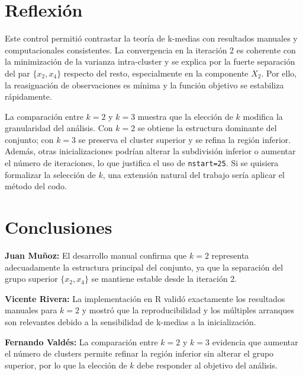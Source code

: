 \documentclass[10pt,a4paper]{article}
\begin{document}
\section{Reflexi\'on}

Este control permiti\'o contrastar la teor\'ia de k-medias con resultados manuales y computacionales consistentes. La convergencia en la iteraci\'on 2 es coherente con la minimizaci\'on de la varianza intra-cluster y se explica por la fuerte separaci\'on del par $\{x_2, x_4\}$ respecto del resto, especialmente en la componente $X_2$. Por ello, la reasignaci\'on de observaciones es m\'inima y la funci\'on objetivo se estabiliza r\'apidamente.

La comparaci\'on entre $k=2$ y $k=3$ muestra que la elecci\'on de $k$ modifica la granularidad del an\'alisis. Con $k=2$ se obtiene la estructura dominante del conjunto; con $k=3$ se preserva el cluster superior y se refina la regi\'on inferior. Adem\'as, otras inicializaciones podr\'ian alterar la subdivisi\'on inferior o aumentar el n\'umero de iteraciones, lo que justifica el uso de \texttt{nstart=25}. Si se quisiera formalizar la selecci\'on de $k$, una extensi\'on natural del trabajo ser\'ia aplicar el m\'etodo del codo.

\section{Conclusiones}

\textbf{Juan Mu\~noz:} El desarrollo manual confirma que $k=2$ representa adecuadamente la estructura principal del conjunto, ya que la separaci\'on del grupo superior $\{x_2, x_4\}$ se mantiene estable desde la iteraci\'on 2.

\textbf{Vicente Rivera:} La implementaci\'on en R valid\'o exactamente los resultados manuales para $k=2$ y mostr\'o que la reproducibilidad y los m\'ultiples arranques son relevantes debido a la sensibilidad de k-medias a la inicializaci\'on.

\textbf{Fernando Vald\'es:} La comparaci\'on entre $k=2$ y $k=3$ evidencia que aumentar el n\'umero de clusters permite refinar la regi\'on inferior sin alterar el grupo superior, por lo que la elecci\'on de $k$ debe responder al objetivo del an\'alisis.

\end{document}
